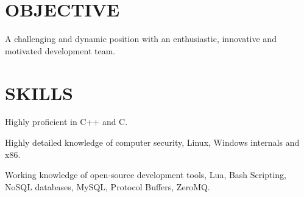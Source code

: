\documentclass[margin]{res}
\begin{document}
 
 

\address{david.andrews112@gmail.com \ \ \ (949) 633-0588}


 
\begin{resume}  

\section{OBJECTIVE}
A challenging and dynamic position with an enthusiastic, innovative and motivated development team.


\section{SKILLS}
\begin{list}{}{\leftmargin=1em}
\item Highly proficient in C++ and C.
\item Highly detailed knowledge of computer security, Linux, Windows internals and x86.
\item Working knowledge of open-source development tools, Lua, Bash Scripting, NoSQL
  databases, MySQL, Protocol Buffers, ZeroMQ.
\end{list}






\end{resume}
\end{document}
